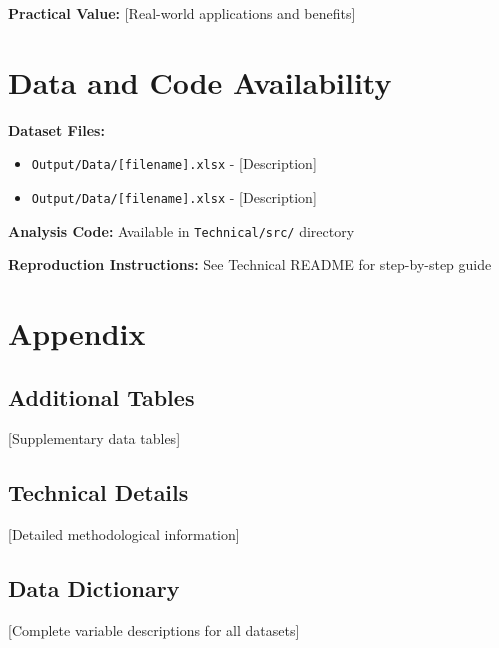 \documentclass[11pt,letterpaper]{article}
\begin{document}
\textbf{Practical Value:} [Real-world applications and benefits]

\section{Data and Code Availability}

\textbf{Dataset Files:}
\begin{itemize}
    \item \texttt{Output/Data/[filename].xlsx} - [Description]
    \item \texttt{Output/Data/[filename].xlsx} - [Description]
\end{itemize}

\textbf{Analysis Code:} Available in \texttt{Technical/src/} directory

\textbf{Reproduction Instructions:} See Technical README for step-by-step guide

\section{Appendix}

\subsection{Additional Tables}
[Supplementary data tables]

\subsection{Technical Details}
[Detailed methodological information]

\subsection{Data Dictionary}
[Complete variable descriptions for all datasets]
\end{document}
